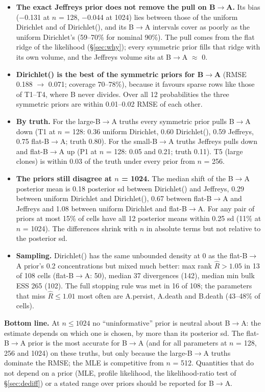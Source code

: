 \documentclass[10pt,a4paper]{article}
\newcommand{\BA}{B$\to$A}
\begin{document}
\begin{itemize}
\item \textbf{The exact Jeffreys prior does not remove the pull on \BA.} Its bias ($-$0.131 at $n$ = 128, $-$0.044 at 1024) lies between those of the uniform Dirichlet and of Dirichlet(\textonehalf), and its \BA{} intervals cover as poorly as the uniform Dirichlet's (59--70\% for nominal 90\%). The pull comes from the flat ridge of the likelihood (\S\ref{sec:why}); every symmetric prior fills that ridge with its own volume, and the Jeffreys volume sits at \BA{} $\approx$ 0.
\item \textbf{Dirichlet(\textonehalf) is the best of the symmetric priors for \BA} (RMSE 0.188 $\to$ 0.071; coverage 70--78\%), because it favours sparse rows like those of T1--T4, where B never divides. Over all 12 probabilities the three symmetric priors are within 0.01--0.02 RMSE of each other.
\item \textbf{By truth.} For the large-\BA{} truths every symmetric prior pulls \BA{} down (T1 at $n$ = 128: 0.36 uniform Dirichlet, 0.60 Dirichlet(\textonehalf), 0.59 Jeffreys, 0.75 flat-\BA; truth 0.80). For the small-\BA{} truths Jeffreys pulls down and flat-\BA{} up (P1 at $n$ = 128: 0.05 and 0.21; truth 0.11). T5 (large clones) is within 0.03 of the truth under every prior from $n$ = 256.
\item \textbf{The priors still disagree at $n$ = 1024.} The median shift of the \BA{} posterior mean is 0.18 posterior sd between Dirichlet(\textonehalf) and Jeffreys, 0.29 between uniform Dirichlet and Dirichlet(\textonehalf), 0.67 between flat-\BA{} and Jeffreys and 1.08 between uniform Dirichlet and flat-\BA. For any pair of priors at most 15\% of cells have all 12 posterior means within 0.25 sd (11\% at $n$ = 1024). The differences shrink with $n$ in absolute terms but not relative to the posterior sd.
\item \textbf{Sampling.} Dirichlet(\textonehalf) has the same unbounded density at 0 as the flat-\BA{} prior's 0.2 concentrations but mixed much better: max rank $\hat R > 1.05$ in 13 of 108 cells (flat-\BA: 50), median 37 divergences (142), median min bulk ESS 265 (102). The full stopping rule was met in 16 of 108; the parameters that miss $\hat R \le 1.01$ most often are A.persist, A.death and B.death (43--48\% of cells).
\end{itemize}
\textbf{Bottom line.} At $n \le 1024$ no ``uninformative'' prior is neutral about \BA: the estimate depends on which one is chosen, by more than its posterior sd. The flat-\BA{} prior is the most accurate for \BA{} (and for all parameters at $n$ = 128, 256 and 1024) on these truths, but only because the large-\BA{} truths dominate the RMSE; the MLE is competitive from $n$ = 512. Quantities that do not depend on a prior (MLE, profile likelihood, the likelihood-ratio test of \S\ref{sec:dediff}) or a stated range over priors should be reported for \BA.
\end{document}
